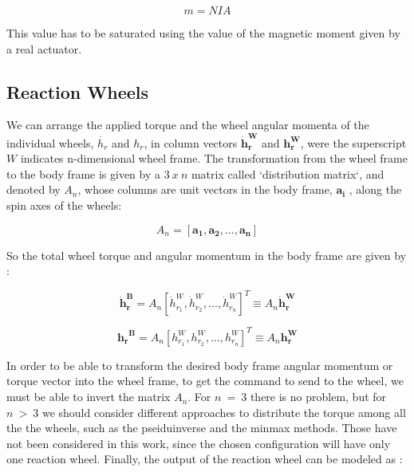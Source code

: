 \documentclass[11pt,a4paper]{report}
\begin{document}
\begin{equation}
 m = NIA
\end{equation}

This value has to be saturated using the value of the magnetic moment given by a real actuator.

\subsection{Reaction Wheels}
We can arrange the applied torque and the wheel angular momenta of the individual wheels, $\dot{h_{r}}$ and $h_{r}$, in column vectors $\mathbf{\dot{h}_{r}^W}$ and $\mathbf{{h_{r}^W}}$, were the superscript $W$ indicates n-dimensional wheel frame. The transformation from the wheel frame to the body frame is given by a $3 \ x \ n$ matrix called `distribution matrix`, and denoted by $\mathit{A_{n}}$, whose columns are unit vectors in the body frame, $\mathbf{a_{i}}$ , along the spin axes of the wheels:

\begin{equation*}
 \mathit{A_{n}} = [\mathbf{a_{1}}, \mathbf{a_{2}},...,\mathbf{a_{n}}]
\end{equation*}

So the total wheel torque and angular momentum in the body frame are given by : 

\begin{equation}
 \mathbf{\dot{h}_{r}^B} = \mathit{A_{n}}[\mathit{\dot{h}_{r_{1}}^W},\mathit{\dot{h}_{r_{2}}^W},...,\mathit{\dot{h}_{r_{n}}^W}]^{T} \equiv \mathit{A_{n}} \mathbf{\dot{h}_{r}^W}
\end{equation}

\begin{equation}
 \mathbf{{h_{r}}^B} = \mathit{A_{n}}[\mathit{{h_{r_{1}}^W}},\mathit{{h_{r_{2}}^W}},...,\mathit{{h_{r_{n}}^W}}]^{T} \equiv \mathit{A_{n}} \mathbf{{h_{r}^W}}
\end{equation}

In order to be able to transform the desired body frame angular momentum or torque vector into the wheel frame, to get the command to send to the wheel, we must be able to invert the matrix $\mathit{A_{n}}$. For $n \ = \ 3$ there is no problem, but for $n \ > \ 3$ we should consider different approaches to distribute the torque among all the the wheels, such as the pseiduinverse and the minmax methods. Those have not been considered in this work, since the chosen configuration will have only one reaction wheel.
Finally, the output of the reaction wheel can be modeled as : 
\end{document}
